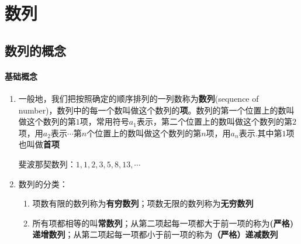 \chapter*{数列}
\section*{数列的概念}
\subsubsection*{基础概念}
\begin{enumerate}
    \item 一般地，我们把按照确定的顺序排列的一列数称为\textbf{数列}(sequence of number)，数列中的每一个数叫做这个数列的\textbf{项}。数列的第一个位置上的数叫做这个数列的第$1$项，常用符号$a_1$表示，第二个位置上的数叫做这个数列的第$2$项，用$a_2$表示$\cdots$第$n$个位置上的数叫做这个数列的第$n$项，用$a_n$表示.其中第$1$项也叫做\textbf{首项}
    \begin{example}
        斐波那契数列：$1,1,2,3,5,8,13,\cdots$
    \end{example}
    \item 数列的分类：
    \begin{enumerate}
        \item 项数有限的数列称为\textbf{有穷数列}；项数无限的数列称为\textbf{无穷数列}
        \begin{example}
        \end{example}
        \item 所有项都相等的叫\textbf{常数列}；从第二项起每一项都大于前一项的称为\textbf{(严格)递增数列}；从第二项起每一项都小于前一项的称为\textbf{（严格）递减数列}
    \end{enumerate}
\end{enumerate}

